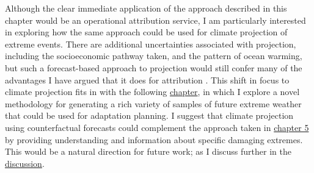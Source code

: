   Although the clear immediate application of the approach described in this chapter would be an operational attribution service, I am particularly interested in exploring how the same approach could be used for climate projection of extreme events. There are additional uncertainties associated with projection, including the socioeconomic pathway taken, and the pattern of ocean warming, but such a forecast-based approach to projection would still confer many of the advantages I have argued that it does for attribution \citep[e.g.][]{hazeleger_tales_2015}. This shift in focus to climate projection fits in with the following \hyperref[ch5]{chapter}, in which I explore a novel methodology for generating a rich variety of samples of future extreme weather that could be used for adaptation planning. I suggest that climate projection using counterfactual forecasts could complement the approach taken in \hyperref[ch5]{chapter 5} by providing understanding and information about specific damaging extremes. This would be a natural direction for future work; as I discuss further in the \hyperref[discussion]{discussion}.